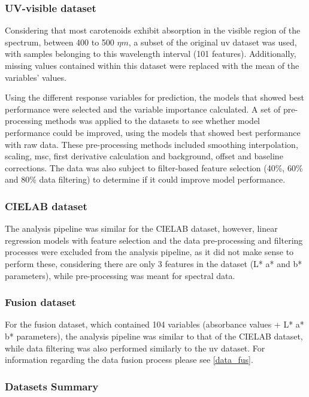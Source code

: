 \subsubsection{UV-visible dataset}

Considering that most carotenoids exhibit absorption in the visible region of the spectrum, between 400 to 500 $\eta m$, a subset of the original \gls{uv} dataset was used, with samples belonging to this wavelength interval (101 features). Additionally, missing values contained within this dataset were replaced with the mean of the variables' values. 

Using the different response variables for prediction, the models that showed best performance were selected and the variable importance calculated. A set of pre-processing methods was applied to the datasets to see whether model performance could be improved, using the models that showed best performance with raw data. These pre-processing methods included smoothing interpolation, scaling, \acrfull{msc}, first derivative calculation and background, offset and baseline corrections. The data was also subject to filter-based feature selection (40\%, 60\% and 80\% data filtering) to determine if it could improve model performance.


\subsubsection{CIELAB dataset}
The analysis pipeline was similar for the CIELAB dataset, however, linear regression models with feature selection and the data pre-processing and filtering processes were excluded from the analysis pipeline, as it did not make sense to perform these, considering there are only 3 features in the dataset (L* a* and b* parameters), while pre-processing was meant for spectral data.

\subsubsection{Fusion dataset}
For the fusion dataset, which contained 104 variables (absorbance values + L* a* b* parameters), the analysis pipeline was similar to that of the CIELAB dataset, while data filtering was also performed similarly to the \gls{uv} dataset. For information regarding the data fusion process please see \autoref{data_fus}.

\subsubsection{Datasets Summary}

